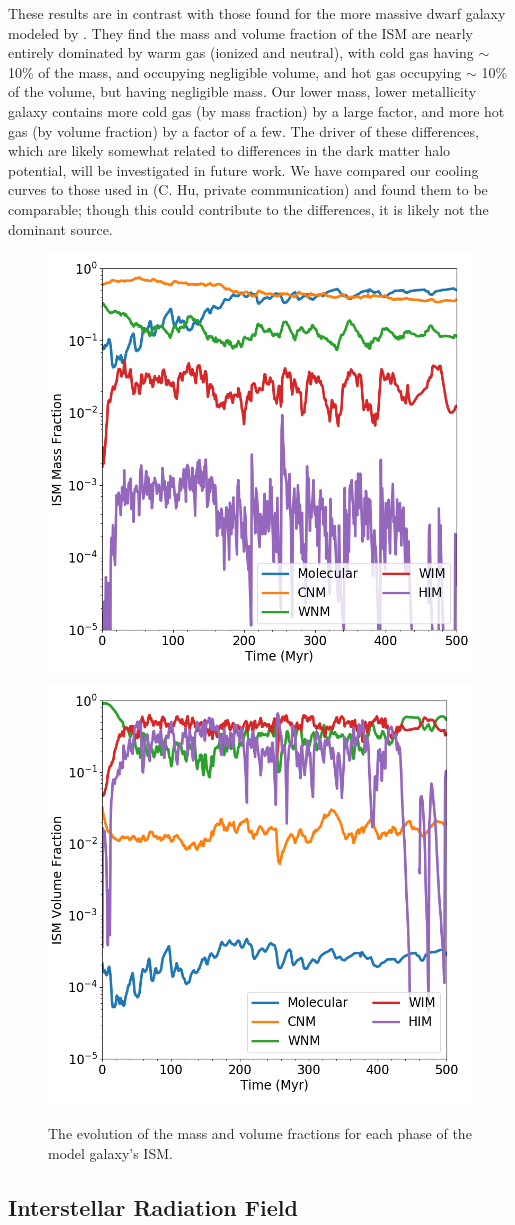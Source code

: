 \documentclass[twocolumn]{aastex61}
\begin{document}
These results are in contrast with those found for the more massive dwarf galaxy modeled by \citet{Hu2016,Hu2017}. They find the mass and volume fraction of the ISM are nearly entirely dominated by warm gas (ionized and neutral), with cold gas having $\sim$ 10\% of the mass, and occupying negligible volume, and hot gas occupying $\sim$ 10\% of the volume, but having negligible mass. Our lower mass, lower metallicity galaxy contains more cold gas (by mass fraction) by a large factor, and more hot gas (by volume fraction) by a factor of a few. The driver of these differences, which are likely somewhat related to differences in the dark matter halo potential, will be investigated in future work. We have compared our cooling curves to those used in \citep{Hu2017} (C. Hu, private communication) and found them to be comparable; though this could contribute to the differences, it is likely not the dominant source.

\begin{figure}
\centering
\includegraphics[width=0.45\linewidth]{phase_mass_fraction_evolution_log.png}
\includegraphics[width=0.45\linewidth]{phase_volume_fraction_evolution_log.png}
\caption{The evolution of the mass and volume fractions for each phase of the model galaxy's ISM.}
\label{fig:ISM_evolution}
\end{figure}

\subsection{Interstellar Radiation Field}
\label{sec:ISRF}
\end{document}
